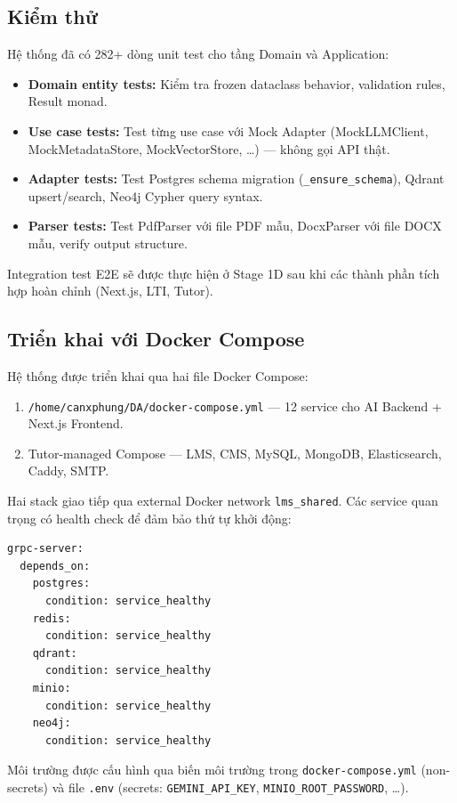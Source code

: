 \subsection{Kiểm thử}

Hệ thống đã có 282+ dòng unit test cho tầng Domain và Application:

\begin{itemize}
    \item \textbf{Domain entity tests:} Kiểm tra frozen dataclass
          behavior, validation rules, Result monad.
    \item \textbf{Use case tests:} Test từng use case với
          Mock Adapter (MockLLMClient, MockMetadataStore,
          MockVectorStore, \dots) --- không gọi API thật.
    \item \textbf{Adapter tests:} Test Postgres schema migration
          (\texttt{\_ensure\_schema}), Qdrant upsert/search,
          Neo4j Cypher query syntax.
    \item \textbf{Parser tests:} Test PdfParser với file PDF mẫu,
          DocxParser với file DOCX mẫu, verify output structure.
\end{itemize}

Integration test E2E sẽ được thực hiện ở Stage 1D sau khi các
thành phần tích hợp hoàn chỉnh (Next.js, LTI, Tutor).

\subsection{Triển khai với Docker Compose}

Hệ thống được triển khai qua hai file Docker Compose:

\begin{enumerate}
    \item \texttt{/home/canxphung/DA/docker-compose.yml} --- 12
          service cho AI Backend + Next.js Frontend.
    \item Tutor-managed Compose --- LMS, CMS, MySQL, MongoDB,
          Elasticsearch, Caddy, SMTP.
\end{enumerate}

Hai stack giao tiếp qua external Docker network
\texttt{lms\_shared}. Các service quan trọng có health check
để đảm bảo thứ tự khởi động:

\begin{lstlisting}[language=sh, caption={Health check example: grpc-server}]
grpc-server:
  depends_on:
    postgres:
      condition: service_healthy
    redis:
      condition: service_healthy
    qdrant:
      condition: service_healthy
    minio:
      condition: service_healthy
    neo4j:
      condition: service_healthy
\end{lstlisting}

Môi trường được cấu hình qua biến môi trường trong
\texttt{docker-compose.yml} (non-secrets) và file
\texttt{.env} (secrets: \texttt{GEMINI\_API\_KEY},
\texttt{MINIO\_ROOT\_PASSWORD}, \dots).
